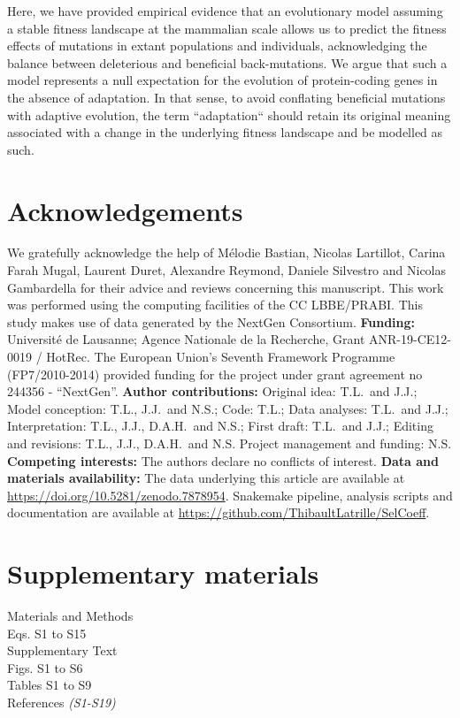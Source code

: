 \documentclass[12pt]{article}
\begin{document}
Here, we have provided empirical evidence that an evolutionary model assuming a stable fitness landscape at the mammalian scale allows us to predict the fitness effects of mutations in extant populations and individuals, acknowledging the balance between deleterious and beneficial back-mutations.
We argue that such a model represents a null expectation for the evolution of protein-coding genes in the absence of adaptation.
In that sense, to avoid conflating beneficial mutations with adaptive evolution, the term ``adaptation`` should retain its original meaning associated with a change in the underlying fitness landscape and be modelled as such.




\section*{Acknowledgements}
\label{sec:acknowledgment}
We gratefully acknowledge the help of Mélodie Bastian, Nicolas Lartillot, Carina Farah Mugal, Laurent Duret, Alexandre Reymond, Daniele Silvestro and Nicolas Gambardella for their advice and reviews concerning this manuscript.
This work was performed using the computing facilities of the CC LBBE/PRABI\@.
This study makes use of data generated by the NextGen Consortium.
\textbf{Funding:}
Université de Lausanne; Agence Nationale de la Recherche, Grant ANR-19-CE12-0019 / HotRec.
The European Union’s Seventh Framework Programme (FP7/2010-2014) provided funding for the project under grant agreement no 244356 - “NextGen”.
\textbf{Author contributions:}
Original idea: T.L.\ and J.J.;
Model conception: T.L., J.J.\ and N.S.;
Code: T.L.;
Data analyses: T.L.\ and J.J.;
Interpretation: T.L., J.J., D.A.H.\ and N.S.;
First draft: T.L.\ and J.J.;
Editing and revisions: T.L., J.J., D.A.H.\ and N.S.
Project management and funding: N.S\@.
\textbf{Competing interests:}
The authors declare no conflicts of interest.
\textbf{Data and materials availability:}
The data underlying this article are available at \url{https://doi.org/10.5281/zenodo.7878954}.
Snakemake pipeline, analysis scripts and documentation are available at \url{https://github.com/ThibaultLatrille/SelCoeff}.


\section*{Supplementary materials}
Materials and Methods\\
Eqs. S1 to S15\\
Supplementary Text\\
Figs. S1 to S6\\
Tables S1 to S9\\
References \textit{(S1-S19)}
\end{document}
